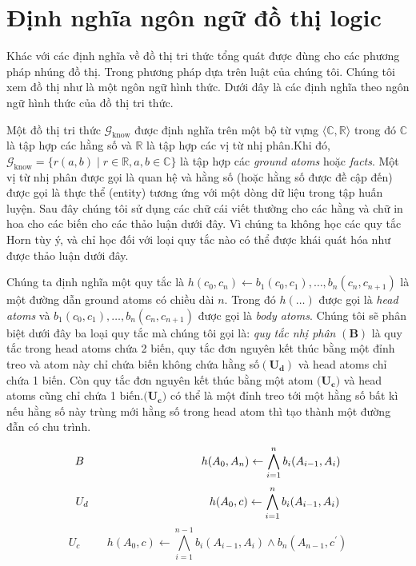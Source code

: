 \section{Định nghĩa ngôn ngữ đồ thị logic}\label{kg}

Khác với các định nghĩa về đồ thị tri thức tổng quát được đùng cho các phương pháp nhúng đồ thị. Trong phương pháp dựa trên luật của chúng tôi. Chúng tôi xem đồ thị như là một ngôn ngữ hình thức. Dưới đây là các định nghĩa theo ngôn ngữ hình thức của đồ thị tri thức.

Một đồ thị tri thức \(\mathcal{G}_{\text{know}}\) được định nghĩa trên một bộ từ vựng \(\langle \mathbb{C}, \mathbb{R} \rangle\) trong đó \(\mathbb{C}\) là tập hợp các hằng số và \(\mathbb{R}\) là tập hợp các vị từ nhị phân.Khi đó, \(\mathcal{G}_{\text{know}} = \{r (a, b) \mid r \in \mathbb{R}, a, b \in \mathbb{C}\}\) là tập hợp các \textit{ground atoms} hoặc \textit{facts}. Một vị từ nhị phân được gọi là quan hệ và hằng số (hoặc hằng số được đề cập đến) được gọi là thực thể (entity) tương ứng với một dòng dữ liệu trong tập huấn luyện. Sau đây chúng tôi sử dụng các chữ cái viết thường cho các hằng và chữ in hoa cho các biến cho các thảo luận dưới đây. Vì chúng ta không học các quy tắc Horn tùy ý, và chỉ học đối với loại quy tắc nào có thể được khái quát hóa như được thảo luận dưới đây.

Chúng ta định nghĩa một quy tắc là \(h(c_0, c_n) \gets b_1(c_0, c_1) ,\dots ,b_n(c_{n}, c_{n + 1})\) là một đường dẫn ground atoms có chiều dài \(n\). Trong đó \(h(\dots)\) được gọi là \textit{head atoms} và \( b_1(c_0, c_1) ,\dots ,b_n(c_{n}, c_{n + 1})\) được gọi là \textit{body atoms}. Chúng tôi sẽ phân biệt dưới đây ba loại quy tắc mà chúng tôi gọi là: \textit{quy tắc nhị phân} \((\mathbf{B})\) là quy tắc trong head atoms chứa 2 biến, quy tắc đơn nguyên kết thúc bằng một đỉnh treo  và atom này chỉ chứa biến không chứa hằng số\((\mathbf{U_d})\) và head atoms chỉ chứa 1 biến. Còn quy tắc đơn nguyên kết thúc bằng một atom \((\mathbf{U_c)}\) và head atoms cũng chỉ chứa 1 biến.\((\mathbf{U_c)}\)  có thể là một đỉnh treo tới một hằng số bất kì nếu hằng số này trùng mới hằng số trong head atom thì tạo thành một đường đẫn có chu trình.

\[B \hspace{3.7cm} h(A_0,A_n) \gets  \bigwedge^n_{i=1} b_i(A_{i-1}, A_i)\]
\[U_d \hspace{3.8cm} h(A_0,c) \gets  \bigwedge^n_{i=1} b_i(A_{i-1}, A_i)\]
\[U_c \hspace{1cm} h(A_0,c) \gets  \bigwedge^{n-1}_{i=1} b_i(A_{i-1}, A_i) \wedge b_n(A_{n-1}, c^{\prime})\]

